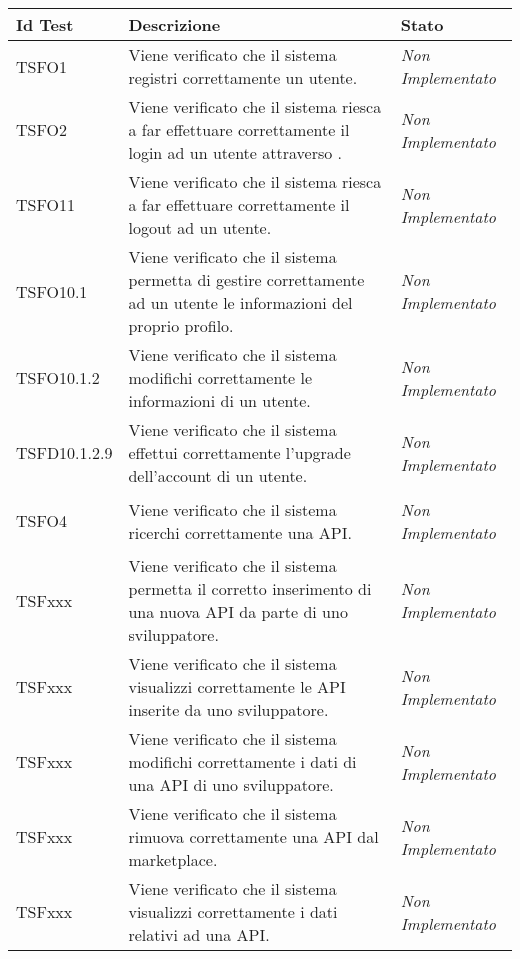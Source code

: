 	\normalsize
	\begin{longtable}{|>{\centering\arraybackslash}p{2.3cm}|>{\centering\arraybackslash}p{7.5cm} | >{\centering\arraybackslash}p{3.8cm}|}
		\hline \rowcolor{Gray}
		\textbf{Id Test} & \textbf{Descrizione} & \textbf{Stato}\\
		\hline
		\endhead
		\hypertarget{TSFO1}{TSFO1} & Viene verificato che il sistema registri correttamente un utente. & \textit{Non Implementato}\\ \hline
		\hypertarget{TSFO2}{TSFO2} & Viene verificato che il sistema riesca a far effettuare correttamente il login ad un utente attraverso \progetto. & \textit{Non Implementato}\\ \hline
		\hypertarget{TSFO11}{TSFO11} & Viene verificato che il sistema riesca a far effettuare correttamente il logout ad un utente.  & \textit{Non Implementato}\\ \hline
		\hypertarget{TSFO10.1}{TSFO10.1} & Viene verificato che il sistema permetta di gestire correttamente ad un utente le informazioni del proprio profilo. & \textit{Non Implementato}\\ \hline
		\hypertarget{TSFO10.1.2}{TSFO10.1.2} & Viene verificato che il sistema modifichi correttamente le informazioni di un utente. & \textit{Non Implementato}\\ \hline
		\hypertarget{TSFD10.1.2.9}{TSFD10.1.2.9} & Viene verificato che il sistema effettui correttamente l'upgrade dell'account di un utente. & \textit{Non Implementato}\\ \hline
		\hypertarget{TSFO4}{TSFO4} & Viene verificato che il sistema ricerchi correttamente una API. & \textit{Non Implementato}\\ \hline
		\hypertarget{TSFxxx}{TSFxxx} & Viene verificato che il sistema permetta il corretto inserimento di una nuova API da parte di uno sviluppatore. & \textit{Non Implementato}\\ \hline
		\hypertarget{TSFxxx}{TSFxxx} & Viene verificato che il sistema visualizzi correttamente le API inserite da uno sviluppatore. & \textit{Non Implementato}\\ \hline
		\hypertarget{TSFxxx}{TSFxxx} & Viene verificato che il sistema modifichi correttamente i dati di una API di uno sviluppatore. & \textit{Non Implementato}\\ \hline
		\hypertarget{TSFxxx}{TSFxxx} & Viene verificato che il sistema rimuova correttamente una API dal marketplace. & \textit{Non Implementato}\\ \hline
		\hypertarget{TSFxxx}{TSFxxx} & Viene verificato che il sistema visualizzi correttamente i dati relativi ad una API. & \textit{Non Implementato}\\ \hline

\end{longtable}
